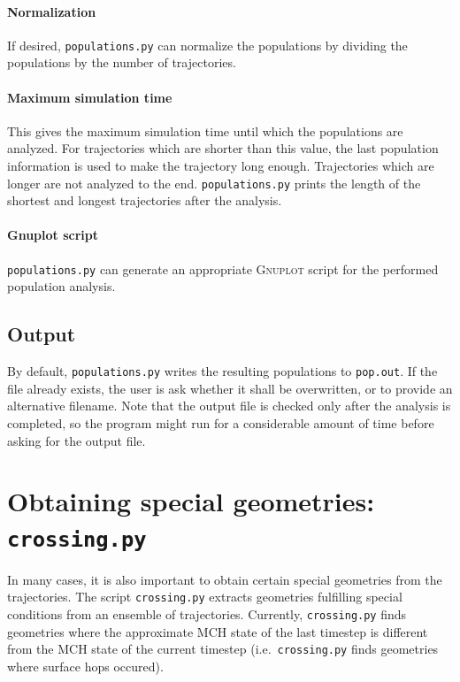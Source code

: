 \documentclass[a4paper,11pt,DIV=15,openany,twoside=false]{scrbook}
\newcommand{\ttt}[1]{\texttt{#1}}
\begin{document}
\paragraph{Normalization}

If desired, \ttt{populations.py} can normalize the populations by dividing the populations by the number of trajectories. 

\paragraph{Maximum simulation time}

This gives the maximum simulation time until which the populations are analyzed. For trajectories which are shorter than this value, the last population information is used to make the trajectory long enough. Trajectories which are longer are not analyzed to the end. \ttt{populations.py} prints the length of the shortest and longest trajectories after the analysis.

\paragraph{Gnuplot script}

\ttt{populations.py} can generate an appropriate \textsc{Gnuplot} script for the performed population analysis. 

\subsection{Output}

By default, \ttt{populations.py} writes the resulting populations to \ttt{pop.out}. If the file already exists, the user is ask whether it shall be overwritten, or to provide an alternative filename. Note that the output file is checked only after the analysis is completed, so the program might run for a considerable amount of time before asking for the output file.


\section{Obtaining special geometries: \ttt{crossing.py}}\label{sec:crossing.py}

In many cases, it is also important to obtain certain special geometries from the trajectories. The script \ttt{crossing.py} extracts geometries fulfilling special conditions from an ensemble of trajectories. Currently, \ttt{crossing.py} finds geometries where the approximate MCH state of the last timestep is different from the MCH state of the current timestep (i.e.\ \ttt{crossing.py} finds geometries where surface hops occured). 
\end{document}

